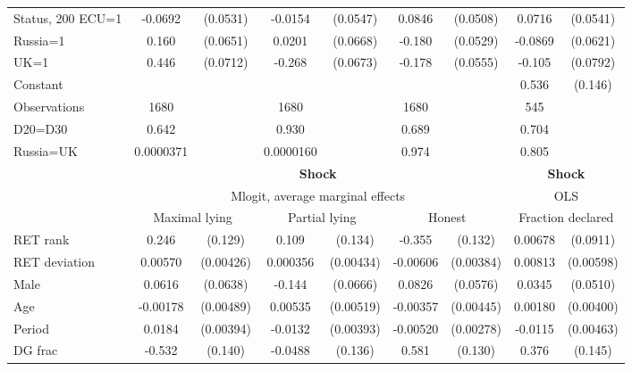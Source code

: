 \begin{tabular}{l|cccccc|cc}
Status, 200 ECU=1&  -0.0692         & (0.0531)&  -0.0154         & (0.0547)&   0.0846\sym{*}  & (0.0508)&   0.0716         & (0.0541)\\
Russia=1        &    0.160\sym{**} & (0.0651)&   0.0201         & (0.0668)&   -0.180\sym{***}& (0.0529)&  -0.0869         & (0.0621)\\
UK=1            &    0.446\sym{***}& (0.0712)&   -0.268\sym{***}& (0.0673)&   -0.178\sym{***}& (0.0555)&   -0.105         & (0.0792)\\
Constant        &                  &         &                  &         &                  &         &    0.536\sym{***}&  (0.146)\\
\hline
Observations    &     1680         &         &     1680         &         &     1680         &         &      545         &         \\
D20=D30         &    0.642         &         &    0.930         &         &    0.689         &         &    0.704         &         \\
Russia=UK       &0.0000371         &         &0.0000160         &         &    0.974         &         &    0.805         &         \\
\hline\hline
&\multicolumn{6}{c|}{\bf Shock}&\multicolumn{2}{c}{\bf Shock}\\ &\multicolumn{6}{c|}{Mlogit, average marginal effects }&\multicolumn{2}{c}{OLS}\\
                &\multicolumn{2}{c}{Maximal lying}&\multicolumn{2}{c}{Partial lying}&\multicolumn{2}{c}{Honest}  &\multicolumn{2}{c}{Fraction declared}\\
\hline
RET rank        &    0.246\sym{*}  &  (0.129)&    0.109         &  (0.134)&   -0.355\sym{***}&  (0.132)&  0.00678         & (0.0911)\\
RET deviation   &  0.00570         &(0.00426)& 0.000356         &(0.00434)& -0.00606         &(0.00384)&  0.00813         &(0.00598)\\
Male            &   0.0616         & (0.0638)&   -0.144\sym{**} & (0.0666)&   0.0826         & (0.0576)&   0.0345         & (0.0510)\\
Age             & -0.00178         &(0.00489)&  0.00535         &(0.00519)& -0.00357         &(0.00445)&  0.00180         &(0.00400)\\
Period          &   0.0184\sym{***}&(0.00394)&  -0.0132\sym{***}&(0.00393)& -0.00520\sym{*}  &(0.00278)&  -0.0115\sym{**} &(0.00463)\\
DG frac         &   -0.532\sym{***}&  (0.140)&  -0.0488         &  (0.136)&    0.581\sym{***}&  (0.130)&    0.376\sym{**} &  (0.145)\\

\end{tabular}
